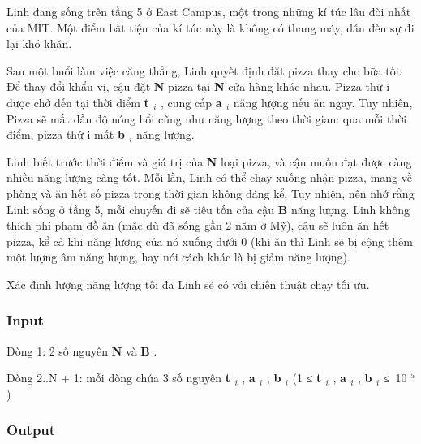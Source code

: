 





    Linh đang sống trên tầng 5 ở East Campus, một trong những kí túc lâu đời nhất của MIT. Một điểm bất tiện của kí túc này là không có thang máy, dẫn đến sự đi lại khó khăn.   



   Sau một buổi làm việc căng thẳng, Linh quyết định đặt pizza thay cho bữa tối. Để thay đổi khẩu vị, cậu đặt   \textbf{    N   }   pizza tại   \textbf{    N   }   cửa hàng khác nhau. Pizza thứ i được chở đến tại thời điểm   \textbf{    t    $_     i    $}   , cung cấp   \textbf{    a    $_     i    $}   năng lượng nếu ăn ngay. Tuy nhiên, Pizza sẽ mất dần độ nóng hổi cũng như năng lượng theo thời gian: qua mỗi thời điểm, pizza thứ i mất   \textbf{    b    $_     i    $}   năng lượng.  

     Linh biết trước thời điểm và giá trị của     \textbf{      N     }     loại pizza, và cậu muốn đạt được càng nhiều năng lượng càng tốt. Mỗi lần, Linh có thể chạy xuống nhận pizza, mang về phòng và ăn hết số pizza trong thời gian không đáng kể. Tuy nhiên, nên nhớ rằng Linh sống ở tầng 5, mỗi chuyến đi sẽ tiêu tốn của cậu     \textbf{      B     }     năng lượng. Linh không thích phí phạm đồ ăn (mặc dù đã sống gần 2 năm ở Mỹ), cậu sẽ luôn ăn hết pizza, kể cả khi năng lượng của nó xuống dưới 0 (khi ăn thì Linh sẽ bị cộng thêm một lượng âm năng lượng, hay nói cách khác là bị giảm năng lượng).    

      Xác định lượng năng lượng tối đa Linh sẽ có với chiến thuật chạy tối ưu.     

\subsubsection{   Input  }

   Dòng 1: 2 số nguyên   \textbf{    N   }   và   \textbf{    B   }   .  

   Dòng 2..N + 1: mỗi dòng chứa 3 số nguyên   \textbf{    t    $_     i    $}   ,   \textbf{    a    $_     i    $}   ,   \textbf{    b    $_     i    $}   (1 ≤   \textbf{    t    $_     i    $}   ,   \textbf{    a    $_     i    $}   ,   \textbf{    b    $_     i    $}   ≤ 10   $^    5   $   )  

\subsubsection{   Output  }

